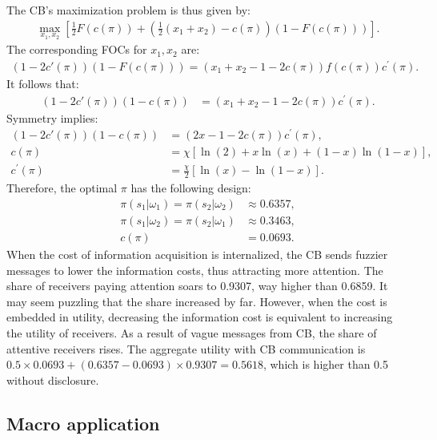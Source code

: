 \documentclass[12pt,a4paper]{article}
\begin{document}
The CB's maximization problem is thus given by:
\begin{align}
    \max_{x_1,x_2} \left[\frac{1}{2}F(c(\pi)) + \left(\frac{1}{2}(x_1+x_2)-c(\pi)\right)(1-F(c(\pi)))\right].
\end{align}
The corresponding FOCs for $x_1,x_2$ are:
\begin{align}
    (1-2c'(\pi))(1-F(c(\pi)))=(x_1+x_2-1-2c(\pi))f(c(\pi))c^\prime(\pi).
\end{align}
It follows that:
\begin{align}
    (1-2c'(\pi))(1-c(\pi)) & = (x_1+x_2-1-2c(\pi))c^\prime(\pi).
\end{align}
Symmetry implies:
\begin{align}
    (1-2c'(\pi))(1-c(\pi)) & = (2x-1-2c(\pi))c^\prime(\pi), \\
    c(\pi) & = \chi[\ln(2)+x\ln(x)+(1-x)\ln(1-x)], \\
    c^\prime(\pi) & = \frac{\chi}{2}[\ln(x)-\ln(1-x)].
\end{align}
Therefore, the optimal $\pi$ has the following design:
\begin{align}
    \pi(s_1|\omega_1) = \pi(s_2|\omega_2) & \approx 0.6357, \\
    \pi(s_1|\omega_2) = \pi(s_2|\omega_1) & \approx 0.3463, \\
    c(\pi) & = 0.0693.
\end{align}
When the cost of information acquisition is internalized, the CB sends fuzzier messages to lower the information costs, thus attracting more attention. The share of receivers paying attention soars to 0.9307, way higher than 0.6859. It may seem puzzling that the share increased by far. However, when the cost is embedded in utility, decreasing the information cost is equivalent to increasing the utility of receivers. As a result of vague messages from CB, the share of attentive receivers rises. The aggregate utility with CB communication is $0.5 \times 0.0693 + (0.6357-0.0693) \times  0.9307 = 0.5618$, which is higher than 0.5 without disclosure. 

\subsection{Macro application}
\end{document}
